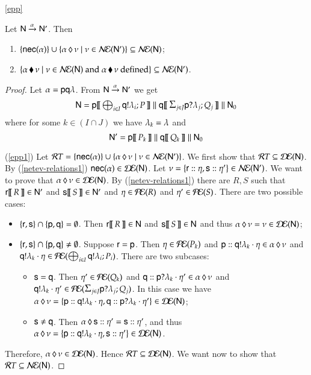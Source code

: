 \begin{lemmaa}{\ref{epp}}{
Let ${\sf N}\xrightarrow{\alpha}{\sf N}'$. Then 
\begin{enumerate}
\item $\{{\sf nec}(\alpha)\}\cup\{{\alpha}\,\lozenge\,{\nu}\mid\nu\in\mathcal{N\!E}({\sf N}')\}\subseteq\mathcal{N\!E}({\sf N})$; 
\item $\{{\alpha}\,\blacklozenge\,{\nu}\mid\nu\in\mathcal{N\!E}({\sf N})\text{ and }{\alpha}\,\blacklozenge\,{\nu}\text{ defined} \}\subseteq\mathcal{N\!E}({\sf N}')$. 
\end{enumerate}
}\end{lemmaa}
\begin{proof}
  Let $\alpha={\sf p}{\sf q}\lambda$. From ${\sf N}\xrightarrow{\alpha}{\sf N}'$ we get
\[
  \Nt=\pP{\pp}{\textstyle{\oupp\q{i}{I}{\la}{\PP}}}\parN
    \pP{\q}{\inp\pp{j}{J}{\la}{\Q}}\parN\Nt_0
    \]
    where
  for some $k\in (I \cap J)$ we have $\lambda_k = \lambda$ and 
\[
  {\sf N}'={\sf p}[\![\,P_k\,]\!]\mathrel{\|} {\sf q}[\![\,Q_k\,]\!]\mathrel{\|}{\sf N}_0
  \]
  
  (\ref{epp1})   Let
  ${\mathcal RT}=\{{\sf nec}(\alpha)\}\cup\{{\alpha}\,\lozenge\,{\nu}\mid\nu\in\mathcal{N\!E}({\sf N}')\}$.
  We first show that ${\mathcal RT}\subseteq\mathcal{D\!E}({\sf N})$.  By
  (\ref{netev-relations1})
  ${\sf nec}(\alpha)\in\mathcal{D\!E}({\sf N})$.  Let $\nu=\{{\sf r}:: \eta,
    {\sf s}:: \eta'\} \in \mathcal{N\!E}({\sf N}')$. We want to prove
  that ${\alpha}\,\lozenge\,{\nu}\in\mathcal{D\!E}({\sf N})$.  By
  (\ref{netev-relations1}) there are $R,S$
  such that ${\sf r}[\![\,R\,]\!]\in{\sf N}'$ and ${\sf s}[\![\,S\,]\!]\in{\sf N}'$ and $\eta\in
  \mathcal{P\!E}(R)$ and $\eta'\in \mathcal{P\!E}(S)$.
%
There are two possible cases:
\begin{itemize}
\item
$\{{\sf r},{\sf s}\} \cap \{{\sf p},{\sf q}\} = \emptyset$. Then
${\sf r}[\![\,R\,]\!]\in{\sf N}$ and ${\sf s}[\![\,S\,]\!]\in{\sf N}$ and thus ${\alpha}\,\lozenge\,{\nu} = \nu \in\mathcal{D\!E}({\sf N})$;
\item $\{{\sf r},{\sf s}\} \cap \{{\sf p},{\sf q}\} \neq \emptyset$. 
Suppose ${\sf r} = {\sf p}$. 
Then $\eta\in\mathcal{P\!E}(P_k)$ and 
${\sf p}:: {\sf q}!\lambda_k\cdot\eta\in{\ensuremath{{\alpha}\,\lozenge\,{\nu}}}$ and
${\sf q}!\lambda_k\cdot\eta\in\mathcal{P\!E}(\bigoplus_{i\in I}{\sf q}!\lambda_i;P_i)$. 
There are two subcases:
\begin{itemize}
\item {} ${\sf s} = {\sf q}$. Then $\eta'\in\mathcal{P\!E}(Q_k)$ and
  ${\sf q}:: {\sf p}?\lambda_k\cdot\eta'\in{\ensuremath{{\alpha}\,\lozenge\,{\nu}}}$ and
  $\sendL\q{\la_k}\cdot\procev'\in\ES(\inp\pp{j}{J}{\la}{\Q})$.  In
  this case we have ${\alpha}\,\lozenge\,{\nu} = \{{\sf p}:: {\sf q}!\lambda_k\cdot\eta, {\sf q}:: {\sf p}?\lambda_k\cdot\eta'\} \in \mathcal{D\!E}({\sf N})$;
%
\item {} ${\sf s} \neq {\sf q}$. Then ${\alpha}\,\lozenge\,{{\sf s}:: \eta'} =
{\sf s}:: \eta'$, and thus ${\alpha}\,\lozenge\,{\nu} =
\{{\sf p}:: {\sf q}!\lambda_k\cdot\eta, {\sf s}:: \eta'\} \in \mathcal{D\!E}({\sf N})$.
\end{itemize}
\end{itemize}
Therefore, ${\alpha}\,\lozenge\,{\nu}\in\mathcal{D\!E}({\sf N})$. 
Hence
${\mathcal RT}\subseteq\mathcal{D\!E}({\sf N})$.  We want now to show that
${\mathcal RT}\subseteq\mathcal{N\!E}({\sf N})$.  




\end{proof}
